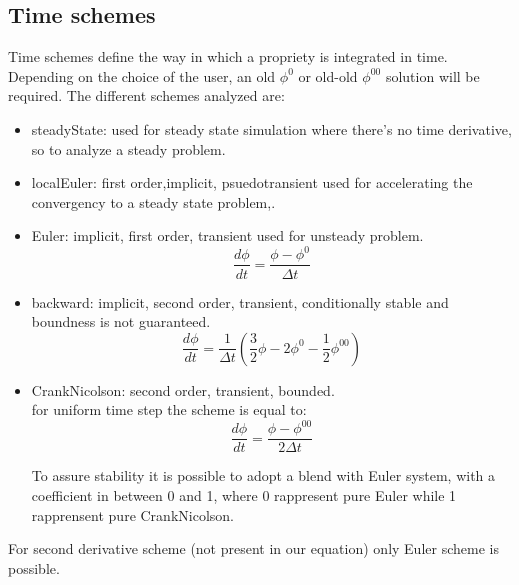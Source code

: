 \documentclass[a4paper,12pt]{article}
\begin{document}
\subsection{Time schemes}
Time schemes define the way in which a propriety is integrated in time. Depending on the choice of the user, an old $\phi^0$ or old-old $\phi^{00}$ solution will be required.
The different schemes analyzed are:
\begin{itemize} 
 \item {\ttfamily steadyState}: used for steady state simulation where there's no time derivative, so to analyze a steady problem.
 
 \item {\ttfamily localEuler}: first order,implicit, psuedotransient used for accelerating the convergency to a steady state problem,.
 
 \item {\ttfamily Euler}: implicit, first order, transient used for unsteady problem.
\begin{equation}
\frac{d \phi}{dt} = \frac{\phi - \phi^0}{\Delta t}
\end{equation} 

 
 \item {\ttfamily backward}: implicit, second order, transient, conditionally stable and boundness is not guaranteed.
\begin{equation}
\frac{d \phi}{dt} = \frac{1}{\Delta t}\left(\frac{3}{2}\phi - 2\phi^0- \frac{1}{2}\phi^{00}\right)
\end{equation} 
 
 \item {\ttfamily CrankNicolson}: second order, transient, bounded. \\for uniform time step the scheme is equal to:
\begin{equation}
 \frac{d \phi}{dt} = \frac{\phi - \phi^{00}}{2\Delta t}
\end{equation} 
 
To assure stability it is possible to adopt a blend with Euler system, with a coefficient in between 0 and 1, where 0 rappresent pure Euler while 1 rapprensent pure CrankNicolson.
 
 \end{itemize} 
 For second derivative scheme (not present in our equation) only Euler scheme is possible.
\end{document}
